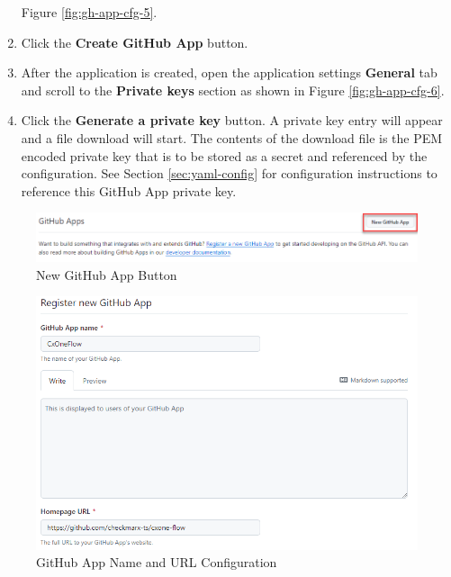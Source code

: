 \begin{enumerate}
    Figure \ref{fig:gh-app-cfg-5}.
    \item Click the \textbf{Create GitHub App} button.
    \item After the application is created, open the application settings \textbf{General} tab and scroll to the
    \textbf{Private keys} section as shown in Figure \ref{fig:gh-app-cfg-6}.
    \item Click the \textbf{Generate a private key} button.  A private key entry will appear and a file download will start.
    The contents of the download file is the PEM encoded private key that is to be stored as a secret and
    referenced by the \cxoneflow configuration.  See Section \ref{sec:yaml-config} for configuration instructions to
    reference this GitHub App private key.
\end{enumerate}

\begin{figure}[ht]
    \includegraphics[width=\textwidth]{graphics/gh-new-app.png}
    \caption{New GitHub App Button}
    \label{fig:gh-new-app}
\end{figure}


\begin{figure}[ht]
    \includegraphics[width=\textwidth]{graphics/gh-app-cfg-1.png}
    \caption{GitHub App Name and URL Configuration}
    \label{fig:gh-app-cfg-1}
\end{figure}

